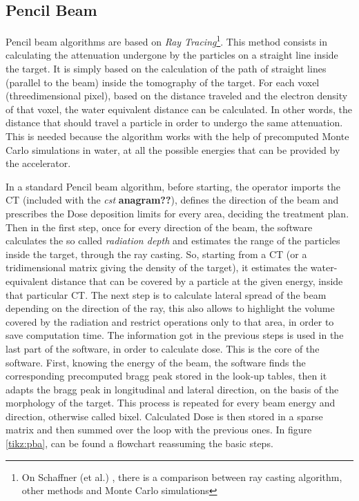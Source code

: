 \documentclass[12pt, a4paper, twoside]{book}
\begin{document}

\subsection{Pencil Beam} 
\label{sec:pen}
Pencil beam algorithms are based on \emph{Ray Tracing}\footnote{On Schaffner (et al.) \cite{schaf:pba}, there is a comparison between ray casting algorithm, other methods and Monte Carlo simulations}. This method consists in calculating the attenuation undergone by the particles on a straight line inside the target. It is simply based on the calculation of the path of straight lines (parallel to the beam) inside the tomography of the target. For each voxel (threedimensional pixel), based on the distance traveled and the electron density of that voxel, the water equivalent distance can be calculated. In other words, the distance that should travel a particle in order to undergo the same attenuation.
This is needed because the algorithm works with the help of precomputed Monte Carlo simulations in water, at all the possible energies that can be provided by the accelerator. 

In a standard Pencil beam algorithm, before starting, the operator imports the CT (included with the \emph{cst} \textbf{anagram??}), defines the direction of the beam and prescribes the Dose deposition limits for every area, deciding the treatment plan.
Then in the first step, once for every direction of the beam, the software calculates the so called \emph{radiation depth} and estimates the range of the particles inside the target, through the ray casting. So, starting from a CT (or a tridimensional matrix giving the density of the target), it estimates the water-equivalent distance that can be covered by a particle at the given energy, inside that particular CT. 
The next step is to calculate lateral spread of the beam depending on the direction of the ray, this also allows to highlight the volume covered by the radiation and restrict operations only to that area, in order to save computation time. 
The information got in the previous steps is used in the last part of the software, in order to calculate dose.
This is the core of the software. First, knowing the energy of the beam, the software finds the corresponding precomputed bragg peak stored in the look-up tables, then it adapts the bragg peak in longitudinal and lateral direction, on the basis of the morphology of the target. 
This process is repeated for every beam energy and direction, otherwise called bixel.
Calculated Dose is then stored in a sparse matrix and then summed over the loop with the previous ones.
In figure \ref{tikz:pba}, can be found a flowchart reassuming the basic steps.
\end{document}
